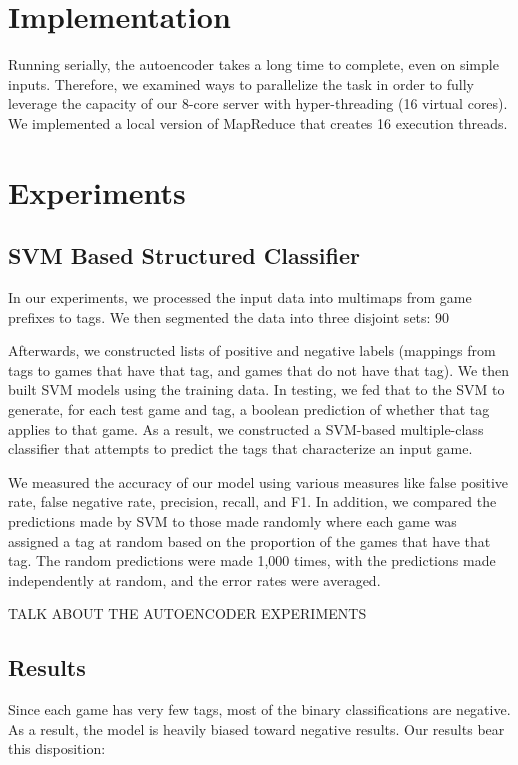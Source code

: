 \documentclass[11pt]{article}
\begin{document}
\section{Implementation} %
Running serially, the autoencoder takes a long time to complete, even on simple inputs. Therefore, we examined ways to parallelize the task in order to fully leverage the capacity of our 8-core server with hyper-threading (16 virtual cores). We implemented a local version of MapReduce that creates 16 execution threads.

\section{Experiments}
\subsection{SVM Based Structured Classifier}
In our experiments, we processed the input data into multimaps from game prefixes to tags. We then segmented the data into three disjoint sets: 90%

Afterwards, we constructed lists of positive and negative labels (mappings from tags to games that have that tag, and games that do not have that tag). We then built SVM models using the training data. In testing, we fed that to the SVM to generate, for each test game and tag, a boolean prediction of whether that tag applies to that game. As a result, we constructed a SVM-based multiple-class classifier that attempts to predict the tags that characterize an input game.

We measured the accuracy of our model using various measures like false positive rate, false negative rate, precision, recall, and F1. In addition, we compared the predictions made by SVM to those made randomly where each game was assigned a tag at random based on the proportion of the games that have that tag. The random predictions were made 1,000 times, with the predictions made independently at random, and the error rates were averaged.

TALK ABOUT THE AUTOENCODER EXPERIMENTS

\subsection{Results}
Since each game has very few tags, most of the binary classifications are negative. As a result, the model is heavily biased toward negative results. Our results bear this disposition:
\end{document}
